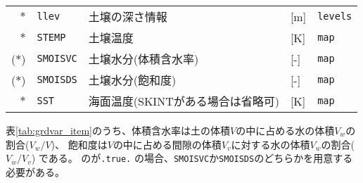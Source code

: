 {\begin{table}[hbt]
\begin{center}
\begin{tabularx}{150mm}{rl|l|l|X}
$\ast$ &\verb|llev|    & 土壌の深さ情報  & [m]      & \verb|levels| \\
$\ast$ &\verb|STEMP|   & 土壌温度        & [K]      & \verb|map| \\
($\ast$) &\verb|SMOISVC| & 土壌水分(体積含水率)     & [-] & \verb|map| \\
($\ast$) &\verb|SMOISDS| & 土壌水分(飽和度)         & [-] & \verb|map| \\
$\ast$ &\verb|SST|     & 海面温度(SKINTがある場合は省略可) & [K] & \verb|map|\\
\end{tabularx}
\end{center}
\end{table}
}

表\ref{tab:grdvar_item}のうち、体積含水率は土の体積$V$の中に占める水の体積$V_w$の割合($V_w / V$)、
飽和度は$V$の中に占める間隙の体積$V_v$に対する水の体積$V_w$の割合($V_w / V_v$)
である。
のが\verb|.true.|
の場合、\verb|SMOISVC|か\verb|SMOISDS|のどちらかを用意する必要がある。

